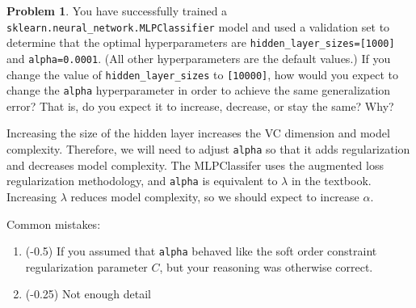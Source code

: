 \documentclass[10pt]{exam}
\theoremstyle{definition}
\newtheorem{problem}{Problem}
\begin{document}
\newpage
\begin{problem}
    You have successfully trained a \lstinline{sklearn.neural_network.MLPClassifier} model and used a validation set to determine that the optimal hyperparameters are \lstinline{hidden_layer_sizes=[1000]} and \lstinline{alpha=0.0001}.
    (All other hyperparameters are the default values.)
    If you change the value of \lstinline{hidden_layer_sizes} to \lstinline{[10000]}, how would you expect to change the \lstinline{alpha} hyperparameter in order to achieve the same generalization error?
    That is, do you expect it to increase, decrease, or stay the same?
    Why?
\end{problem}
\begin{solution}
    Increasing the size of the hidden layer increases the VC dimension and model complexity.
    Therefore, we will need to adjust \lstinline{alpha} so that it adds regularization and decreases model complexity.
    The MLPClassifer uses the augmented loss regularization methodology, and \lstinline{alpha} is equivalent to $\lambda$ in the textbook.
    Increasing $\lambda$ reduces model complexity,
    so we should expect to increase $\alpha$.

    Common mistakes:
    \begin{enumerate}
        \item (-0.5) If you assumed that \lstinline{alpha} behaved like the soft order constraint regularization parameter $C$, but your reasoning was otherwise correct.
        \item (-0.25) Not enough detail
    \end{enumerate}
\end{solution}
\end{document}
